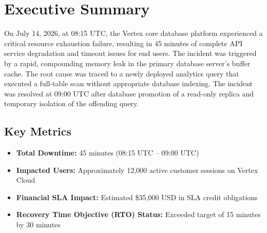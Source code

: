 \section{Executive Summary}
On July 14, 2026, at 08:15 UTC, the Vertex core database platform experienced a critical resource exhaustion failure, resulting in 45 minutes of complete API service degradation and timeout issues for end users. The incident was triggered by a rapid, compounding memory leak in the primary database server's buffer cache. The root cause was traced to a newly deployed analytics query that executed a full-table scan without appropriate database indexing. The incident was resolved at 09:00 UTC after database promotion of a read-only replica and temporary isolation of the offending query.

\subsection{Key Metrics}
\begin{itemize}[label=\textcolor{SecondaryColor}{\tiny\faCircle}, leftmargin=15pt, nosep]
  \item \textbf{Total Downtime:} 45 minutes (08:15 UTC -- 09:00 UTC)
  \item \textbf{Impacted Users:} Approximately 12,000 active customer sessions on Vertex Cloud
  \item \textbf{Financial SLA Impact:} Estimated \$35,000 USD in SLA credit obligations
  \item \textbf{Recovery Time Objective (RTO) Status:} Exceeded target of 15 minutes by 30 minutes
\end{itemize}

\vspace{0.3cm}


